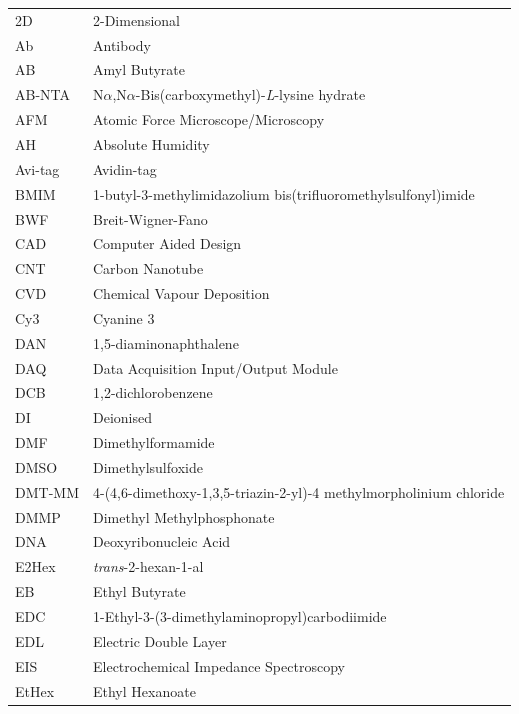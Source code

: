 \documentclass[
  a4paper,
]{scrbook}
\begin{document}
\begin{table}[H]
  \begin{tabular}{@{}p{} p{}@{}}  %
    2D  & 2-Dimensional  \\[5pt]
    Ab  & Antibody  \\[5pt]
    AB  & Amyl Butyrate  \\[5pt]
    AB-NTA  & N$\alpha$,N$\alpha$-Bis(carboxymethyl)-\textit{L}-lysine hydrate  \\[5pt]
    AFM  & Atomic Force Microscope/Microscopy  \\[5pt]
    AH  & Absolute Humidity  \\[5pt]
    Avi-tag  & Avidin-tag  \\[5pt]
    BMIM  & 1-butyl-3-methylimidazolium bis(trifluoromethylsulfonyl)imide  \\[5pt]
    BWF  & Breit-Wigner-Fano  \\[5pt]
    CAD  & Computer Aided Design \\[5pt]
    CNT  & Carbon Nanotube  \\[5pt]
    CVD  & Chemical Vapour Deposition  \\[5pt]
    Cy3  & Cyanine 3  \\[5pt]
    DAN  & 1,5-diaminonaphthalene  \\[5pt]
    DAQ  & Data Acquisition Input/Output Module  \\[5pt]
    DCB  & 1,2-dichlorobenzene  \\[5pt]
    DI  & Deionised  \\[5pt]
    DMF  & Dimethylformamide   \\[5pt]
    DMSO  & Dimethylsulfoxide   \\[5pt]
    DMT-MM   & 4-(4,6-dimethoxy-1,3,5-triazin-2-yl)-4 methylmorpholinium chloride \\[5pt]
    DMMP  & Dimethyl Methylphosphonate  \\[5pt]
    DNA  & Deoxyribonucleic Acid  \\[5pt]
    E2Hex  & \textit{trans}-2-hexan-1-al  \\[5pt]
    EB  & Ethyl Butyrate  \\[5pt]
    EDC  & 1-Ethyl-3-(3-dimethylaminopropyl)carbodiimide  \\[5pt]
    EDL  & Electric Double Layer  \\[5pt]
    EIS  & Electrochemical Impedance Spectroscopy  \\[5pt]
    EtHex  & Ethyl Hexanoate  \\[5pt]
  \end{tabular}
\end{table}
\end{document}
